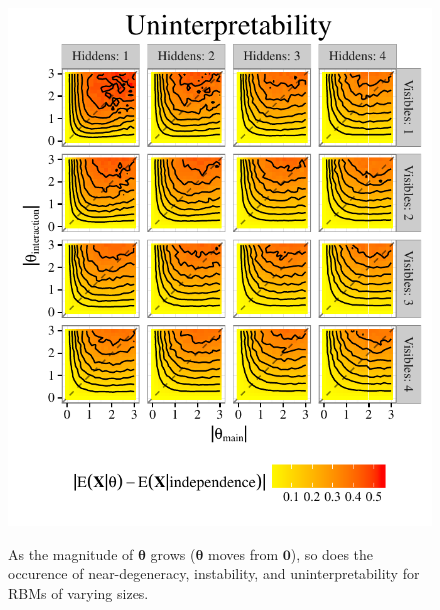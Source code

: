 \documentclass[extrafontsizes, 30pt]{memoir}
\begin{document}
\begin{textblock}{14}
\begin{figure}
\includegraphics{images/uninterpretability.pdf}
\label{fig:three_ways}
\caption{As the magnitude of $\boldsymbol \theta$ grows ($\boldsymbol \theta$ moves from $\boldsymbol 0$), so does the occurence of near-degeneracy, instability, and uninterpretability for RBMs of varying sizes.}
\end{figure}
\end{textblock}
\end{document}
